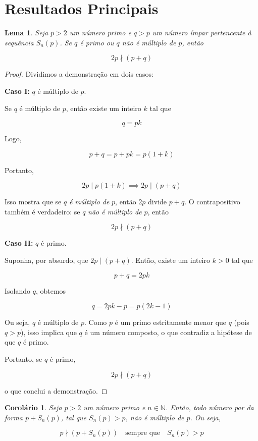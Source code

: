 \documentclass[a4paper,11pt]{article}
\newtheorem{lemma}[theorem]{Lema}
\newtheorem{corollary}[theorem]{Corolário}
\theoremstyle{definition}
\theoremstyle{remark}
\begin{document}
	\section{Resultados Principais}
	\begin{lemma}\label{lema:multip}
		Seja \(p > 2\) um número primo e \(q > p\) um número ímpar pertencente à sequência \(S_n(p)\). Se \(q\) é primo ou \(q\) não é múltiplo de \(p\), então
		
		\[
		2p \nmid (p + q)
		\]
	\end{lemma}
	\begin{proof}
		Dividimos a demonstração em dois casos:
		
		\textbf{Caso I:} \(q\) é múltiplo de \(p\).
		
		Se \(q\) é múltiplo de \(p\), então existe um inteiro \(k\) tal que
		
		\[
		q = pk
		\]
		
		Logo,
		
		\[
		p + q = p + pk = p(1 + k)
		\]
		
		Portanto,
		
		\[
		2p \mid p(1 + k) \implies 2p \mid (p + q)
		\]
		
		Isso mostra que se \(q\) \textit{é múltiplo de} \(p\), então \(2p\) divide \(p + q\). O contrapositivo também é verdadeiro: se \(q\) \textit{não é múltiplo de} \(p\), então
		
		\[
		2p \nmid (p + q)
		\]
		
		\textbf{Caso II:} \(q\) é primo.
		
		Suponha, por absurdo, que \(2p \mid (p + q)\). Então, existe um inteiro \(k > 0\) tal que
		
		\[
		p + q = 2p k
		\]
		
		Isolando \(q\), obtemos
		
		\[
		q = 2p k - p = p(2k - 1)
		\]
		
		Ou seja, \(q\) é múltiplo de \(p\). Como \(p\) é um primo estritamente menor que \(q\) (pois \(q > p\)), isso implica que \(q\) é um número composto, o que contradiz a hipótese de que \(q\) é primo.
		
		Portanto, se \(q\) é primo,
		
		\[
		2p \nmid (p + q)
		\]
		
		o que conclui a demonstração.
	\end{proof}
	
	\begin{corollary}
		Seja \(p > 2\) um número primo e \(n \in \mathbb{N}\). Então, todo número par da forma \(p + S_n(p)\), tal que \(S_n(p) > p\), não é múltiplo de \(p\). Ou seja,
		
		\[
		p \nmid (p + S_n(p)) \quad \text{sempre que} \quad S_n(p) > p
		\]
		
	\end{corollary}
	
\end{document}
